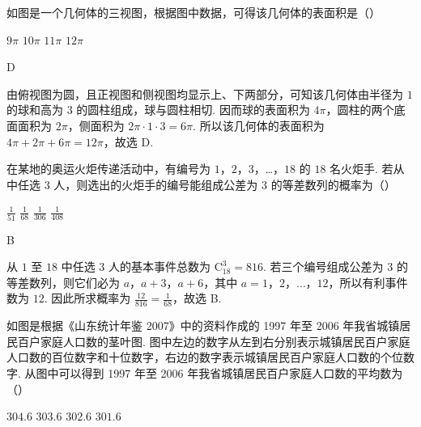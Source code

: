 \begin{problem}
如图是一个几何体的三视图，根据图中数据，可得该几何体的表面积是（\quad）


\choices
    {\(9\pi\)}
    {\(10\pi\)}
    {\(11\pi\)}
    {\(12\pi\)}
\end{problem}

\begin{answer}
D
\end{answer}

\begin{solution}
由俯视图为圆，且正视图和侧视图均显示上、下两部分，可知该几何体由半径为 \(1\) 的球和高为 \(3\) 的圆柱组成，球与圆柱相切. 因而球的表面积为 \(4\pi\)，圆柱的两个底面面积为 \(2\pi\)，侧面积为 \(2\pi\cdot1\cdot3=6\pi\). 所以该几何体的表面积为 \(4\pi+2\pi+6\pi=12\pi\)，故选 D.
\end{solution}

\begin{problem}
在某地的奥运火炬传递活动中，有编号为 \(1\)，\(2\)，\(3\)，…，\(18\) 的 \(18\) 名火炬手. 若从中任选 \(3\) 人，则选出的火炬手的编号能组成公差为 \(3\) 的等差数列的概率为（\quad）

\choices
    {\(\frac{1}{51}\)}
    {\(\frac{1}{68}\)}
    {\(\frac{1}{306}\)}
    {\(\frac{1}{408}\)}
\end{problem}

\begin{answer}
B
\end{answer}

\begin{solution}
从 \(1\) 至 \(18\) 中任选 \(3\) 人的基本事件总数为 \(\mathrm C_{18}^{3}=816\). 若三个编号组成公差为 \(3\) 的等差数列，则它们必为 \(a\)，\(a+3\)，\(a+6\)，其中 \(a=1\)，\(2\)，\(\ldots\)，\(12\)，所以有利事件数为 \(12\). 因此所求概率为 \(\frac{12}{816}=\frac1{68}\)，故选 B.
\end{solution}

\begin{problem}
如图是根据《山东统计年鉴 2007》中的资料作成的 1997 年至 2006 年我省城镇居民百户家庭人口数的茎叶图. 图中左边的数字从左到右分别表示城镇居民百户家庭人口数的百位数字和十位数字，右边的数字表示城镇居民百户家庭人口数的个位数字. 从图中可以得到 1997 年至 2006 年我省城镇居民百户家庭人口数的平均数为（\quad）



\choices
    {\(304.6\)}
    {\(303.6\)}
    {\(302.6\)}
    {\(301.6\)}
\end{problem}

